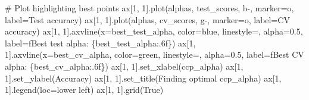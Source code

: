 \documentclass[
  letterpaper,
  DIV=11,
  numbers=noendperiod]{scrreprt}
\newenvironment{Shaded}{\begin{snugshade}}{\end{snugshade}}
\newcommand{\CommentTok}[1]{\textcolor[rgb]{0.37,0.37,0.37}{#1}}
\newcommand{\DecValTok}[1]{\textcolor[rgb]{0.68,0.00,0.00}{#1}}
\newcommand{\FloatTok}[1]{\textcolor[rgb]{0.68,0.00,0.00}{#1}}
\newcommand{\NormalTok}[1]{\textcolor[rgb]{0.00,0.23,0.31}{#1}}
\newcommand{\OperatorTok}[1]{\textcolor[rgb]{0.37,0.37,0.37}{#1}}
\newcommand{\SpecialCharTok}[1]{\textcolor[rgb]{0.37,0.37,0.37}{#1}}
\newcommand{\SpecialStringTok}[1]{\textcolor[rgb]{0.13,0.47,0.30}{#1}}
\newcommand{\StringTok}[1]{\textcolor[rgb]{0.13,0.47,0.30}{#1}}
\newcommand{\VariableTok}[1]{\textcolor[rgb]{0.07,0.07,0.07}{#1}}
\begin{document}
\begin{Shaded}
\begin{Highlighting}[]
\CommentTok{\# Plot highlighting best points}
\NormalTok{ax[}\DecValTok{1}\NormalTok{, }\DecValTok{1}\NormalTok{].plot(alphas, test\_scores, }\StringTok{\textquotesingle{}b{-}\textquotesingle{}}\NormalTok{, marker}\OperatorTok{=}\StringTok{\textquotesingle{}o\textquotesingle{}}\NormalTok{, label}\OperatorTok{=}\StringTok{\textquotesingle{}Test accuracy\textquotesingle{}}\NormalTok{)}
\NormalTok{ax[}\DecValTok{1}\NormalTok{, }\DecValTok{1}\NormalTok{].plot(alphas, cv\_scores, }\StringTok{\textquotesingle{}g{-}\textquotesingle{}}\NormalTok{, marker}\OperatorTok{=}\StringTok{\textquotesingle{}o\textquotesingle{}}\NormalTok{, label}\OperatorTok{=}\StringTok{\textquotesingle{}CV accuracy\textquotesingle{}}\NormalTok{)}
\NormalTok{ax[}\DecValTok{1}\NormalTok{, }\DecValTok{1}\NormalTok{].axvline(x}\OperatorTok{=}\NormalTok{best\_test\_alpha, color}\OperatorTok{=}\StringTok{\textquotesingle{}blue\textquotesingle{}}\NormalTok{, linestyle}\OperatorTok{=}\StringTok{\textquotesingle{}{-}{-}\textquotesingle{}}\NormalTok{, alpha}\OperatorTok{=}\FloatTok{0.5}\NormalTok{, }
\NormalTok{                label}\OperatorTok{=}\SpecialStringTok{f\textquotesingle{}Best test alpha: }\SpecialCharTok{\{}\NormalTok{best\_test\_alpha}\SpecialCharTok{:.6f\}}\SpecialStringTok{\textquotesingle{}}\NormalTok{)}
\NormalTok{ax[}\DecValTok{1}\NormalTok{, }\DecValTok{1}\NormalTok{].axvline(x}\OperatorTok{=}\NormalTok{best\_cv\_alpha, color}\OperatorTok{=}\StringTok{\textquotesingle{}green\textquotesingle{}}\NormalTok{, linestyle}\OperatorTok{=}\StringTok{\textquotesingle{}{-}{-}\textquotesingle{}}\NormalTok{, alpha}\OperatorTok{=}\FloatTok{0.5}\NormalTok{,}
\NormalTok{                label}\OperatorTok{=}\SpecialStringTok{f\textquotesingle{}Best CV alpha: }\SpecialCharTok{\{}\NormalTok{best\_cv\_alpha}\SpecialCharTok{:.6f\}}\SpecialStringTok{\textquotesingle{}}\NormalTok{)}
\NormalTok{ax[}\DecValTok{1}\NormalTok{, }\DecValTok{1}\NormalTok{].set\_xlabel(}\StringTok{\textquotesingle{}ccp\_alpha\textquotesingle{}}\NormalTok{)}
\NormalTok{ax[}\DecValTok{1}\NormalTok{, }\DecValTok{1}\NormalTok{].set\_ylabel(}\StringTok{\textquotesingle{}Accuracy\textquotesingle{}}\NormalTok{)}
\NormalTok{ax[}\DecValTok{1}\NormalTok{, }\DecValTok{1}\NormalTok{].set\_title(}\StringTok{\textquotesingle{}Finding optimal ccp\_alpha\textquotesingle{}}\NormalTok{)}
\NormalTok{ax[}\DecValTok{1}\NormalTok{, }\DecValTok{1}\NormalTok{].legend(loc}\OperatorTok{=}\StringTok{\textquotesingle{}lower left\textquotesingle{}}\NormalTok{)}
\NormalTok{ax[}\DecValTok{1}\NormalTok{, }\DecValTok{1}\NormalTok{].grid(}\VariableTok{True}\NormalTok{)}


\end{Highlighting}
\end{Shaded}
\end{document}
